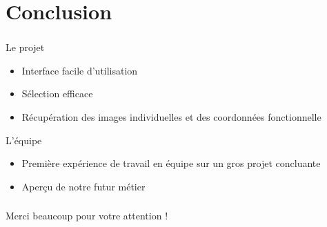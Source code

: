 \documentclass[11pt]{beamer}
\begin{document}
\section{Conclusion}
\begin{frame}
\frametitle{\secname}
	\begin{block}{Le projet}
		\begin{itemize}
			\item Interface facile d'utilisation
			\item Sélection efficace
			\item Récupération des images individuelles et des coordonnées fonctionnelle
		\end{itemize}
	\end{block}
	\begin{block}{L'équipe}
		\begin{itemize}
			\item Première expérience de travail en équipe sur un gros projet concluante
			\item Aperçu de notre futur métier
		\end{itemize}
	\end{block}
\end{frame}
\begin{frame}
	\frametitle{}
	\begin{block}{}
		\begin{center}
			Merci beaucoup pour votre attention ! %
		\end{center}
	\end{block}
\end{frame}
\end{document}
